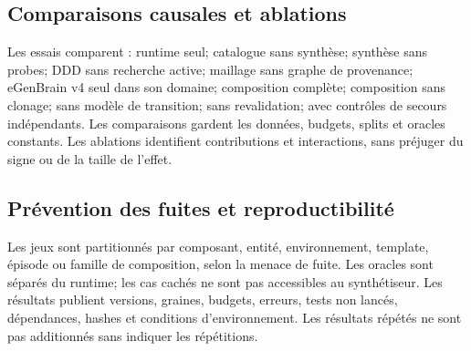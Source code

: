 \documentclass[11pt,a4paper]{article}
\begin{document}
\subsection{Comparaisons causales et ablations}
Les essais comparent : runtime seul; catalogue sans synthèse; synthèse sans probes; DDD sans recherche active; maillage sans graphe de provenance; eGenBrain v4 seul dans son domaine; composition complète; composition sans clonage; sans modèle de transition; sans revalidation; avec contrôles de secours indépendants. Les comparaisons gardent les données, budgets, splits et oracles constants. Les ablations identifient contributions et interactions, sans préjuger du signe ou de la taille de l'effet.

\subsection{Prévention des fuites et reproductibilité}
Les jeux sont partitionnés par composant, entité, environnement, template, épisode ou famille de composition, selon la menace de fuite. Les oracles sont séparés du runtime; les cas cachés ne sont pas accessibles au synthétiseur. Les résultats publient versions, graines, budgets, erreurs, tests non lancés, dépendances, hashes et conditions d'environnement. Les résultats répétés ne sont pas additionnés sans indiquer les répétitions.
\end{document}
